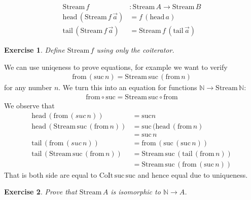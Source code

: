 \documentclass{article}
\newcommand{\Nat}{\mathbb{N}}
\newcommand{\suc}{\mathrm{suc}}
\newcommand{\Stream}{\mathrm{Stream}}
\newcommand{\head}{\mathrm{head}}
\newcommand{\tail}{\mathrm{tail}}
\newcommand{\CoIt}{\mathrm{CoIt}}
\newcommand{\from}{\mathrm{from}}
\newtheorem{exercise}{Exercise}
\begin{document}
\begin{align*}
\Stream\,f & : \Stream\,A \to \Stream\,B \\
\head\,(\Stream\,f\,\vec{a}) & = f\,(\head\,a) \\
\tail\,(\Stream\,f\,\vec{a}) & = \Stream\,f\,(\tail\,\vec{a})
\end{align*}
\begin{exercise}
  Define $\Stream\,f$ using only the coiterator.
\end{exercise}

We can use uniqeness to prove equations, for example we want to verify
\begin{align*}
\from\,(\suc\,n) = \Stream\,\suc\,(\from\,n)
\end{align*}
for any number $n$. We turn this into an equation for functions $\Nat \to \Stream\,\Nat$:
\begin{align*}
  \from \circ \suc = \Stream\,\suc \circ \from
\end{align*}
We observe that 
\begin{align*}
  \head\,(\from\,(suc\,n)) & = \suc n\\
  \head\,(\Stream\,\suc\,(\from\,n)) & = \suc\,(\head\,(\from\,n) \\
  & = \suc\,n\\
  \tail\, (\from\,(suc\,n)) & = \from\,(\suc\,(\suc\,n))\\
  \tail\, (\Stream\,\suc\,(\from\,n)) & = \Stream\,\suc\,(\tail\,(\from\,n))\\
                                        & = \Stream\,\suc\,(\from\,(\suc\,n))
\end{align*}
That is both side are equal to $\CoIt\,\suc\,\suc$ and hence equal due to uniqueness. 

\begin{exercise}
  Prove that $\Stream\,A$ is isomorphic to $\Nat \to A$.
\end{exercise}
\end{document}

